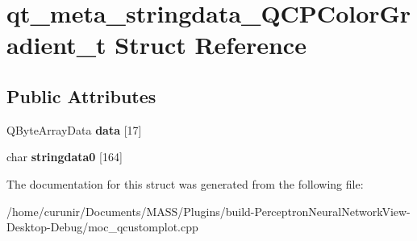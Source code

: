 \hypertarget{structqt__meta__stringdata___q_c_p_color_gradient__t}{}\section{qt\+\_\+meta\+\_\+stringdata\+\_\+\+Q\+C\+P\+Color\+Gradient\+\_\+t Struct Reference}
\label{structqt__meta__stringdata___q_c_p_color_gradient__t}
\subsection*{Public Attributes}
\begin{DoxyCompactItemize}
\item 
Q\+Byte\+Array\+Data {\bfseries data} \mbox{[}17\mbox{]}\hypertarget{structqt__meta__stringdata___q_c_p_color_gradient__t_a4b1142eed666e972a34a24fbcd9338e7}{}\label{structqt__meta__stringdata___q_c_p_color_gradient__t_a4b1142eed666e972a34a24fbcd9338e7}

\item 
char {\bfseries stringdata0} \mbox{[}164\mbox{]}\hypertarget{structqt__meta__stringdata___q_c_p_color_gradient__t_af6991165899703d0e9df570ab79718c3}{}\label{structqt__meta__stringdata___q_c_p_color_gradient__t_af6991165899703d0e9df570ab79718c3}

\end{DoxyCompactItemize}


The documentation for this struct was generated from the following file\+:\begin{DoxyCompactItemize}
\item 
/home/curunir/\+Documents/\+M\+A\+S\+S/\+Plugins/build-\/\+Perceptron\+Neural\+Network\+View-\/\+Desktop-\/\+Debug/moc\+\_\+qcustomplot.\+cpp\end{DoxyCompactItemize}

